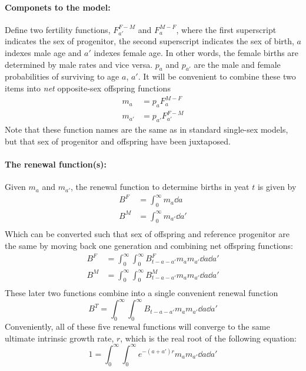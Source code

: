 \paragraph{Componets to the model: }
Define two fertility functions, $F_{a'}^{F-M}$ and $F_a^{M-F}$, where the first
superscript indicates the sex of progenitor, the second superscript indicates
the sex of birth, $a$ indexes male age and $a'$ indexes female age. In
other words, the female births are determined by male rates and vice versa.
$p_a$ and $p_{a'}$ are the male and female probabilities of surviving to age 
$a$, $a'$. It will be convenient to combine these two items into \textit{net}
opposite-sex offspring functions
\begin{align}
m_a &= p_aF_a^{M-F}\\
m_{a'} &= p_{a'}F_{a'}^{F-M}
\end{align}
Note that these function names are the same as in standard single-sex models,
but that sex of progenitor and offspring have been juxtaposed.
\paragraph{The renewal function(s): }
Given $m_a$ and $m_{a'}$, the renewal function to determine births in yeat $t$
is given by
\begin{align}
B^F &= \int_0^\infty m_a \dd a\\
B^M &= \int_0^\infty m_{a'} \dd a'\\
\end{align}
Which can be converted such that sex of offspring and reference
progenitor are the same by moving back one generation and combining net
offspring functions:
\begin{align}
B^F &= \int_0^\infty \int_0^\infty B^F_{t-a-a'} m_am_{a'}\dd a \dd a'\\
B^M &= \int_0^\infty \int_0^\infty B^M_{t-a-a'} m_am_{a'}\dd a \dd a'\\
\end{align}
These later two functions combine into a single convenient renewal function
\begin{equation}
B^T = \int_0^\infty \int_0^\infty B_{t-a-a'}m_am_{a'}\dd a \dd a'
\end{equation}
Conveniently, all of these five renewal functions will converge to the same
ultimate intrinsic growth rate, $r$, which is the real root of the following equation: 
\begin{equation}
1 = \int_0^\infty \int_0^\infty e^{-(a+a')r}m_am_{a'}\dd a \dd a'
\end{equation}

